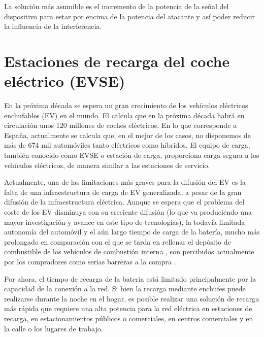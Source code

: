 \documentclass[12pt,a4paper,onecolumn,oneside]{report}
\begin{document}
\begin{enumerate}
\begin{enumerate}
La solución más asumible es el incremento de la potencia de la señal del dispositivo para estar por encima de la potencia del atacante y así poder reducir la influencia de la interferencia.



\end{enumerate}


\end{enumerate}




\chapter{Estaciones de recarga del coche eléctrico (EVSE)}
\label{Estaciones de recarga del coche eléctrico (EVSE)}

En la próxima década se espera un gran crecimiento de los vehículos eléctricos enchufables (EV) en el mundo. El calcula que en la próxima década habrá en circulación unos 120 millones de coches eléctricos. En lo que corresponde a España, actualmente se calcula que, en el mejor de los casos, no disponemos de más de 674 mil automóviles tanto eléctricos como híbridos. El equipo de carga, también conocido como EVSE o estación de carga, proporciona carga segura a los vehículos eléctricos, de manera similar a las estaciones de servicio. 

Actualmente, una de las limitaciones más graves para la difusión del EV es la falta de una infraestructura de carga de EV generalizada, a pesar de la gran difusión de la infraestructura eléctrica. Aunque se espera que el problema del coste de los EV disminuya con su creciente difusión (lo que va produciendo una mayor investigación y avance en este tipo de tecnologías), la todavía limitada autonomía del automóvil y el aún largo tiempo de carga de la batería, mucho más prolongado en comparación con el que se tarda en rellenar el depósito de combustible de los vehículos de combustión interna \cite{diezuno}, son percibidos actualmente por los compradores como serias barreras a la compra \cite{diezdos}\cite{dieztres}.

Por ahora, el tiempo de recarga de la batería está limitado principalmente por la capacidad de la conexión a la red. Si bien la recarga mediante enchufes puede realizarse durante la noche en el hogar, es posible realizar una solución de recarga más rápida que requiere una alta potencia para la red eléctrica en estaciones de recarga, en estacionamientos públicos o comerciales, en centros comerciales y en la calle o los lugares de trabajo.
\end{document}
